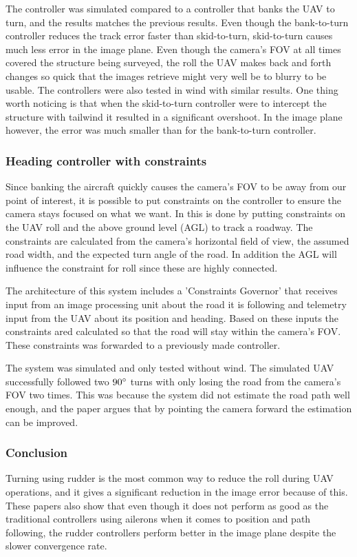 The controller was simulated compared to a controller that banks the UAV to turn, and the results matches the previous results. Even though the bank-to-turn controller reduces the track error faster than skid-to-turn, skid-to-turn causes much less error in the image plane. Even though the camera's FOV at all times covered the structure being surveyed, the roll the UAV makes back and forth changes so quick that the images retrieve might very well be to blurry to be usable. The controllers were also tested in wind with similar results. One thing worth noticing is that when the skid-to-turn controller were to intercept the structure with tailwind it resulted in a significant overshoot. In the image plane however, the error was much smaller than for the bank-to-turn controller.


\subsubsection{Heading controller with constraints}
Since banking the aircraft quickly causes the camera's FOV to be away from our point of interest, it is possible to put constraints on the controller to ensure the camera stays focused on what we want. In \cite{constraintsEGBERT} this is done by putting constraints on the UAV roll and the above ground level (AGL) to track a roadway. The constraints are calculated from the camera's horizontal field of view, the assumed road width, and the expected turn angle of the road. In addition the AGL will influence the constraint for roll since these are highly connected.

The architecture of this system includes a 'Constraints Governor' that receives input from an image processing unit about the road it is following and telemetry input from the UAV about its position and heading. Based on these inputs the constraints ared calculated so that the road will stay within the camera's FOV. These constraints was forwarded to a previously made controller.

The system was simulated and only tested without wind. The simulated UAV successfully followed two $90 \degree$ turns with only losing the road from the camera's FOV two times. This was because the system did not estimate the road path well enough, and the paper argues that by pointing the camera forward the estimation can be improved.


\subsubsection{Conclusion}
Turning using rudder is the most common way to reduce the roll during UAV operations, and it gives a significant reduction in the image error because of this. These papers also show that even though it does not perform as good as the traditional controllers using ailerons when it comes to position and path following, the rudder controllers perform better in the image plane despite the slower convergence rate.

